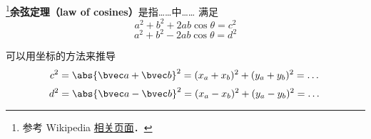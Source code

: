 
\begin{issues}
\issueDraft
\end{issues}

\footnote{参考 Wikipedia \href{https://en.wikipedia.org/wiki/Law_of_cosines}{相关页面}．}\textbf{余弦定理（law of cosines）}是指……中…… 满足
\begin{equation}
a^2 + b^2 + 2ab\cos\theta = c^2
\end{equation}
\begin{equation}
a^2 + b^2 - 2ab\cos\theta = d^2
\end{equation}



可以用坐标的方法来推导
\begin{equation}
c^2 = \abs{\bvec a + \bvec b}^2 = (x_a + x_b)^2 + (y_a + y_b)^2 = \dots
\end{equation}
\begin{equation}
d^2 = \abs{\bvec a - \bvec b}^2 = (x_a - x_b)^2 + (y_a - y_b)^2 = \dots
\end{equation}

